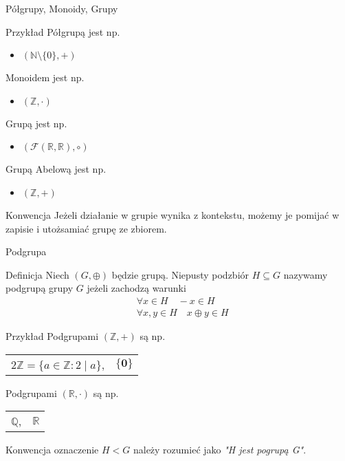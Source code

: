 \documentclass{beamer}
\newcommand{\zero}{\mathbf{0}}
\begin{document}
\begin{frame}{Półgrupy, Monoidy, Grupy}
    \begin{exampleblock}{Przykład}
        Półgrupą jest np.
        \begin{itemize}
            \item $(\mathbb{N}\setminus \{0\} , +)$
        \end{itemize}
        Monoidem jest np. 
        \begin{itemize}
            \item $ ( \mathbb{Z}, \cdot )$
        \end{itemize}
        Grupą jest np.
        \begin{itemize}
            \item $(\mathcal{F}(\mathbb{R},\mathbb{R}), \circ)$
        \end{itemize}
        Grupą Abelową jest np.
        \begin{itemize}
            \item $( \mathbb{Z}, +)$
        \end{itemize}
        
    \end{exampleblock}
    \pause 
    \begin{alertblock}{Konwencja}
        Jeżeli działanie w grupie wynika z kontekstu, możemy je pomijać w zapisie i utożsamiać grupę ze zbiorem.
    \end{alertblock}
\end{frame}

\begin{frame}{Podgrupa}
    \begin{block}{Definicja}
        Niech $(G, \oplus)$ będzie grupą. Niepusty podzbiór $H \subseteq G$ nazywamy podgrupą grupy $G$
        jeżeli zachodzą warunki 
        \begin{align*}
            & \forall  x \in H  \quad -x \in H \\ 
            & \forall x,y \in H  \quad x \oplus y \in H
        \end{align*}
    \end{block}
    \pause 
    \begin{exampleblock}{Przykład}
        Podgrupami  $(\mathbb{Z}, +)$ są np.

        \begin{tabular}{cc}
              $2\mathbb{Z} = \{a \in \mathbb{Z} : 2 \mid a\}$, & 
            $\{ \zero\}$
        \end{tabular}

        Podgrupami  $(\mathbb{R}, \cdot)$ są np.
        
        \begin{tabular}{cc}
            $\mathbb{Q}$, & $\mathbb{R}$
        \end{tabular}
    \end{exampleblock}
    \pause 
    \begin{alertblock}{Konwencja}
        oznaczenie $H < G$ należy rozumieć jako \textit{"H jest pogrupą G"}.
    \end{alertblock}
\end{frame}
\end{document}
